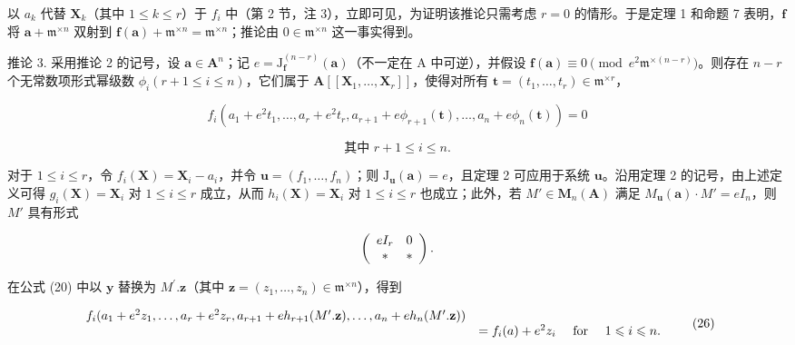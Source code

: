 以 \(a_k\) 代替 \(\mathbf{X}_k\)（其中 \(1 \leqslant k \leqslant r\)）于 \(f_i\) 中（第 2 节，注 3），立即可见，为证明该推论只需考虑 \(r = 0\) 的情形。于是定理 1 和命题 7 表明，\(\mathbf{f}\) 将 \(\mathbf{a} + \mathfrak{m}^{\times n}\) 双射到 \(\mathbf{f}(\mathbf{a}) + \mathfrak{m}^{\times n} = \mathfrak{m}^{\times n}\)；推论由 \(0 \in \mathfrak{m}^{\times n}\) 这一事实得到。

推论 3. 采用推论 2 的记号，设 \(\mathbf{a} \in \mathbf{A}^n\)；记 \(e = \mathrm{J}_{\mathbf{f}}^{(n-r)}(\mathbf{a})\)（不一定在 A 中可逆），并假设 \(\mathbf{f}(\mathbf{a}) \equiv 0 \pmod{e^2\mathfrak{m}^{\times(n-r)}}\)。则存在 \(n - r\) 个无常数项形式幂级数 \(\phi_i (r + 1 \leqslant i \leqslant n)\)，它们属于 \(\mathbf{A}[[\mathbf{X}_1, \ldots, \mathbf{X}_r]]\)，使得对所有 \(\mathbf{t} = (t_1, \ldots, t_r) \in \mathfrak{m}^{\times r}\)，

\[
f _ {i} \left(a _ {1} + e ^ {2} t _ {1}, \dots , a _ {r} + e ^ {2} t _ {r}, a _ {r + 1} + e \phi_ {r + 1} (\mathbf {t}), \dots , a _ {n} + e \phi_ {n} (\mathbf {t})\right) = 0
\]

\[
\text{其中 } r + 1 \leqslant i \leqslant n.
\]

对于 \(1 \leqslant i \leqslant r\)，令 \(f_{i}(\mathbf{X}) = \mathbf{X}_{i} - a_{i}\)，并令 \(\mathbf{u} = (f_{1}, \ldots, f_{n})\)；则 \(\mathrm{J}_{\mathbf{u}}(\mathbf{a}) = e\)，且定理 2 可应用于系统 \(\mathbf{u}\)。沿用定理 2 的记号，由上述定义可得 \(g_{i}(\mathbf{X}) = \mathbf{X}_{i}\) 对 \(1 \leqslant i \leqslant r\) 成立，从而 \(h_{i}(\mathbf{X}) = \mathbf{X}_{i}\) 对 \(1 \leqslant i \leqslant r\) 也成立；此外，若 \(M' \in \mathbf{M}_{n}(\mathbf{A})\) 满足 \(M_{\mathbf{u}}(\mathbf{a}) \cdot M' = eI_{n}\)，则 \(M'\) 具有形式

\[
\left( \begin{array}{c c} e I _ {r} & 0 \\ * & * \end{array} \right).
\]

在公式 (20) 中以 \(\mathbf{y}\) 替换为 \(M^{\prime}.\mathbf{z}\)（其中 \(\mathbf{z} = (z_{1},\ldots ,z_{n})\in \mathfrak{m}^{\times n}\)），得到

\[
\begin{array}{r l} f _ {i} (a _ {1} + e ^ {2} z _ {1}, \dots , a _ {r} + e ^ {2} z _ {r}, a _ {r + 1} + e h _ {r + 1} (M ^ {\prime}. \mathbf {z}), \dots , a _ {n} + e h _ {n} (M ^ {\prime}. \mathbf {z})) \\ & = f _ {i} (a) + e ^ {2} z _ {i} \quad \text { for } \quad 1 \leqslant i \leqslant n. \end{array}\tag{26}
\]

